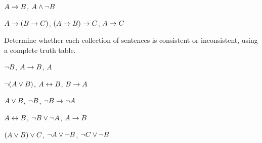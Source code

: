 \begin{earg}
% 
%


\item $A \rightarrow B$, $A \wedge \neg B$\vspace{.5ex} %

\item $A \rightarrow (B \rightarrow C)$, $(A \rightarrow B) \rightarrow C$, $A \rightarrow C$\vspace{.5ex} %

\end{earg}

\noindent\problempart
\label{pr.TT.consistent}
Determine whether each collection of sentences is consistent or inconsistent, using a complete truth table. 
\begin{earg}
\item $\neg B$, $A \rightarrow B$, $A$ \vspace{.5ex}%
\item $\neg(A \vee B)$, $A \leftrightarrow B$, $B \rightarrow A$\vspace{.5ex} %
\item $A \vee B$, $\neg B$, $\neg B \rightarrow \neg A$\vspace{.5ex} %
\item $A \leftrightarrow B$, $\neg B \vee \neg A$, $A \rightarrow B$\vspace{.5ex} %
\item $(A \vee B) \vee C$, $\neg A \vee \neg B$, $\neg C \vee \neg B$\vspace{.5ex} %
\end{earg}




